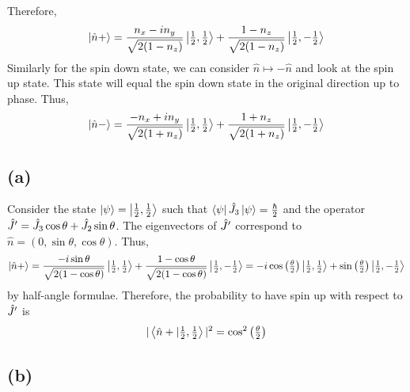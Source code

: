 \documentclass[12pt]{extarticle}
\begin{document}
Therefore, 
\[ \left| \hat{n} + \right> = \frac{n_{x} - i n_{y}}{\sqrt{2(1- n_z)}} \left| \tfrac{1}{2}, \tfrac{1}{2} \right> + \frac{1 - n_z}{\sqrt{2(1- n_z)}} \left| \tfrac{1}{2}, - \tfrac{1}{2} \right>\]
Similarly for the spin down state, we can consider $\hat{n} \mapsto -\hat{n}$ and look at the spin up state. This state will equal the spin down state in the original direction up to phase. Thus,
\[ \left| \hat{n} - \right> = \frac{-n_{x} + i n_{y}}{\sqrt{2(1 + n_z)}} \left| \tfrac{1}{2}, \tfrac{1}{2} \right> + \frac{1 + n_z}{\sqrt{2(1 + n_z)}} \left| \tfrac{1}{2}, - \tfrac{1}{2} \right>\] 

\subsection*{(a)}
Consider the state $\left| \psi \right> = \left| \tfrac{1}{2}, \tfrac{1}{2} \right>$ such that $\left< \psi \right| \hat{J}_3 \left| \psi \right> = \frac{\hbar}{2}$ and the operator $\hat{J}' = \hat{J}_3 \cos{\theta} + \hat{J}_2 \sin{\theta}$. The eigenvectors of $\hat{J}'$ correspond to $\hat{n} = (0, \sin{\theta}, \cos{\theta})$. Thus, 
\[\left| \hat{n} +  \right> = \frac{- i \sin{\theta} }{\sqrt{2(1 - \cos{\theta})}} \left| \tfrac{1}{2}, \tfrac{1}{2} \right> + \frac{1 - \cos{\theta}}{\sqrt{2(1 - \cos{\theta})}} \left| \tfrac{1}{2}, - \tfrac{1}{2} \right> = -i \cos{\left(\tfrac{\theta}{2} \right)}\left| \tfrac{1}{2}, \tfrac{1}{2} \right> + \sin{\left( \tfrac{\theta}{2} \right)} \left| \tfrac{1}{2}, -\tfrac{1}{2} \right> \]
by half-angle formulae. Therefore, the probability to have spin up with respect to $\hat{J}'$ is 
\[|\left< \hat{n}+ | \tfrac{1}{2}, \tfrac{1}{2} \right>|^2 = \cos^2{\left(\tfrac{\theta}{2}\right)}\]

\subsection*{(b)}
\end{document}
